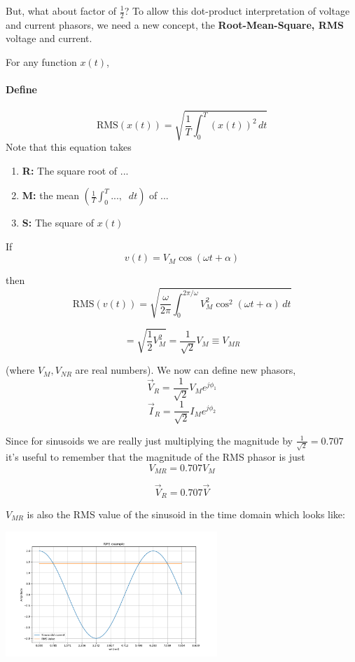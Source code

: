But, what about factor of $\frac{1}{2}$?    To allow this dot-product interpretation of
voltage and current phasors, we need a new concept, the {\bf Root-Mean-Square, RMS} voltage
and current.

For any function $x(t)$,

\paragraph{Define}

\[
\text{RMS}(x(t)) = \sqrt{\frac{1}{T} \int_0^T (x(t))^2 \, dt}
\]
Note that this equation takes
\begin{enumerate}
    \item {\bf R: } The square root of ...
    \item {\bf M: }the mean $\left ( \frac{1}{T} \int_0^T ... ,\;\; dt \right )$ of ...
    \item {\bf S: }The square of $x(t)$
\end{enumerate}

If
\[
v(t) = V_M \cos(\omega t + \alpha)
\]

then
\[
\text{RMS}(v(t)) = \sqrt{\frac{\omega}{2\pi} \int_0^{2\pi/\omega} V_M^2 \cos^2(\omega t + \alpha) \, dt}
\]


\[
=\sqrt{ \frac{1}{2} V_M^2 }
= \frac{1}{\sqrt{2}} V_M \equiv V_{MR}
\]

(where $V_M, V_{NR}$ are real numbers).
We now can  define new phasors,
\[
\vec V_R = \frac {1}  {\sqrt{2}}  V_M e^{j\phi_1}
\]
\[
\vec I_R = \frac {1}  {\sqrt{2}}  I_M e^{j\phi_2}
\]

Since for sinusoids we are really just multiplying the magnitude by $\frac {1}  {\sqrt{2}} = 0.707$ it's useful to remember
that  the magnitude of the RMS phasor is just
\[
V_{MR} = 0.707 V_M
\]

\[
\vec V_R = 0.707 \vec V
\]

$V_{MR}$ is also the RMS value of the sinusoid in the time domain
which looks like:

\includegraphics[width=80mm]{figsChapt03/FP56580.png}


